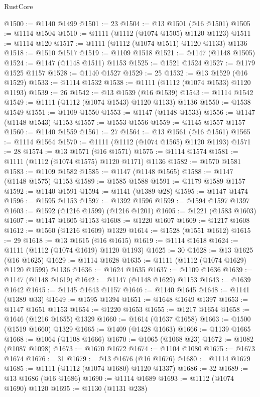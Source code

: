 \begin{lexlean}{RustCore}
\begin{coremodule}
@1500 := @1140 @1499
@1501 := 23
@1504 := @13 @1501 (@16 @1501)
@1505 := @1114 @1504
@1510 := @1111 (@1112 (@1074 @1505) @1120 @1123)
@1511 := @1114 @120
@1517 := @1111 (@1112 (@1074 @1511) @1120 @1133) @1136
@1518 := @1510 @1517
@1519 := @1109 @1518
@1521 := @1147 (@1148 @1505)
@1524 := @1147 (@1148 @1511) @1153
@1525 := @1521 @1524
@1527 := @1179 @1525 @1157
@1528 := @1140 @1527
@1529 := 25
@1532 := @13 @1529 (@16 @1529)
@1533 := @1114 @1532
@1538 := @1111 (@1112 (@1074 @1533) @1120 @1193)
@1539 := 26
@1542 := @13 @1539 (@16 @1539)
@1543 := @1114 @1542
@1549 := @1111 (@1112 (@1074 @1543) @1120 @1133) @1136
@1550 := @1538 @1549
@1551 := @1109 @1550
@1553 := @1147 (@1148 @1533)
@1556 := @1147 (@1148 @1543) @1153
@1557 := @1553 @1556
@1559 := @1145 @1557 @1157
@1560 := @1140 @1559
@1561 := 27
@1564 := @13 @1561 (@16 @1561)
@1565 := @1114 @1564
@1570 := @1111 (@1112 (@1074 @1565) @1120 @1193)
@1571 := 28
@1574 := @13 @1571 (@16 @1571)
@1575 := @1114 @1574
@1581 := @1111 (@1112 (@1074 @1575) @1120 @1171) @1136
@1582 := @1570 @1581
@1583 := @1109 @1582
@1585 := @1147 (@1148 @1565)
@1588 := @1147 (@1148 @1575) @1153
@1589 := @1585 @1588
@1591 := @1179 @1589 @1157
@1592 := @1140 @1591
@1594 := @1141 (@1389 @28)
@1595 := @1147 @1474
@1596 := @1595 @1153
@1597 := @1392 @1596
@1599 := @1594 @1597 @1397
@1603 := @1592 (@1216 @1599) (@1216 @1201)
@1605 := @1221 (@1583 @1603)
@1607 := @1147 @1605 @1153
@1608 := @1220 @1607
@1609 := @1217 @1608
@1612 := @1560 (@1216 @1609) @1329
@1614 := @1528 (@1551 @1612)
@1615 := 29
@1618 := @13 @1615 (@16 @1615)
@1619 := @1114 @1618
@1624 := @1111 (@1112 (@1074 @1619) @1120 @1193)
@1625 := 30
@1628 := @13 @1625 (@16 @1625)
@1629 := @1114 @1628
@1635 := @1111 (@1112 (@1074 @1629) @1120 @1599) @1136
@1636 := @1624 @1635
@1637 := @1109 @1636
@1639 := @1147 (@1148 @1619)
@1642 := @1147 (@1148 @1629) @1153
@1643 := @1639 @1642
@1645 := @1145 @1643 @1157
@1646 := @1140 @1645
@1648 := @1141 (@1389 @33)
@1649 := @1595 @1394
@1651 := @1648 @1649 @1397
@1653 := @1147 @1651 @1153
@1654 := @1220 @1653
@1655 := @1217 @1654
@1658 := @1646 (@1216 @1655) @1329
@1660 := @1614 (@1637 @1658)
@1663 := @1500 (@1519 @1660) @1329
@1665 := @1409 (@1428 @1663)
@1666 := @1139 @1665
@1668 := @1064 (@1108 @1666)
@1670 := @1065 (@1068 @23)
@1672 := @1082 (@1087 @1098)
@1673 := @1670 @1672
@1674 := @1104 @1080
@1675 := @1673 @1674
@1676 := 31
@1679 := @13 @1676 (@16 @1676)
@1680 := @1114 @1679
@1685 := @1111 (@1112 (@1074 @1680) @1120 @1337)
@1686 := 32
@1689 := @13 @1686 (@16 @1686)
@1690 := @1114 @1689
@1693 := @1112 (@1074 @1690) @1120
@1695 := @1130 (@1131 @238)

\end{coremodule}
\end{lexlean}
